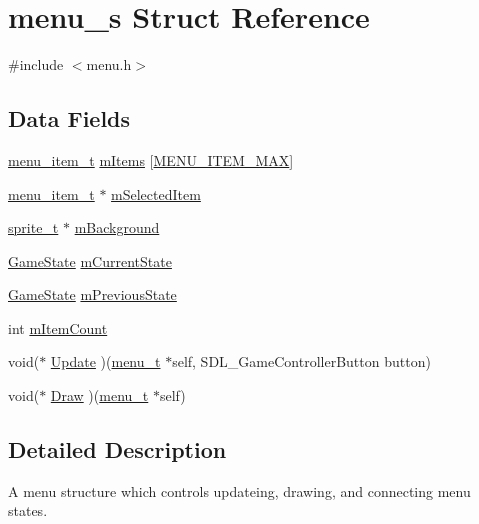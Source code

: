 \hypertarget{structmenu__s}{}\section{menu\+\_\+s Struct Reference}
\label{structmenu__s}


{\ttfamily \#include $<$menu.\+h$>$}

\subsection*{Data Fields}
\begin{DoxyCompactItemize}
\item 
\hyperlink{menu_8h_affefd3de0ee32201a1e405b126d4a8dd}{menu\+\_\+item\+\_\+t} \hyperlink{structmenu__s_a0cc653a44ba5b3f6fc46b8c43131c18b}{m\+Items} \mbox{[}\hyperlink{menu_8h_ab4ca22b3abeffba22f56886bbb39c0f9}{M\+E\+N\+U\+\_\+\+I\+T\+E\+M\+\_\+\+M\+AX}\mbox{]}
\item 
\hyperlink{menu_8h_affefd3de0ee32201a1e405b126d4a8dd}{menu\+\_\+item\+\_\+t} $\ast$ \hyperlink{structmenu__s_a02f9bbc347b039857ac927bfa84b66cf}{m\+Selected\+Item}
\item 
\hyperlink{graphics_8h_a5371414b10358aeda7c6bcec8196342f}{sprite\+\_\+t} $\ast$ \hyperlink{structmenu__s_ab2cdfd66047e062b1da2948d07f9f90d}{m\+Background}
\item 
\hyperlink{globals_8h_a7899b65f1ea0f655e4bbf8d2a5714285}{Game\+State} \hyperlink{structmenu__s_a0f4930e7bfb881141c55f2ff6532343c}{m\+Current\+State}
\item 
\hyperlink{globals_8h_a7899b65f1ea0f655e4bbf8d2a5714285}{Game\+State} \hyperlink{structmenu__s_a5caad79c0b16c966cdace805942e2592}{m\+Previous\+State}
\item 
int \hyperlink{structmenu__s_a20f9c9276293cccf509c5102dad0698a}{m\+Item\+Count}
\item 
void($\ast$ \hyperlink{structmenu__s_afdc00f47a596fec9f5362aeab002e868}{Update} )(\hyperlink{menu_8h_aed08c6d5d5b5d87ad2368f169239217c}{menu\+\_\+t} $\ast$self, S\+D\+L\+\_\+\+Game\+Controller\+Button button)
\item 
void($\ast$ \hyperlink{structmenu__s_ab0d1e3b40626060280d7a069ef441961}{Draw} )(\hyperlink{menu_8h_aed08c6d5d5b5d87ad2368f169239217c}{menu\+\_\+t} $\ast$self)
\end{DoxyCompactItemize}


\subsection{Detailed Description}
A menu structure which controls updateing, drawing, and connecting menu states.

